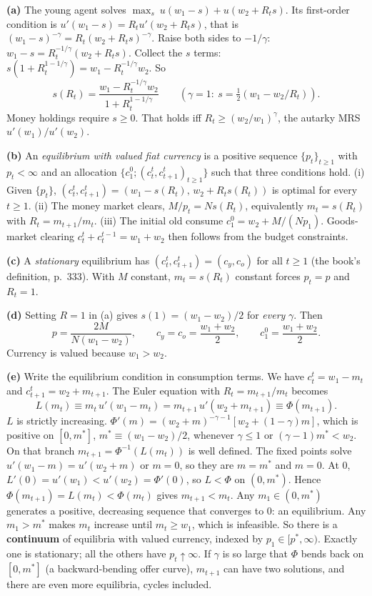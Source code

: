 \documentclass[12pt, letterpaper]{article}
\begin{document}
\begin{tcolorbox}[oddbox,title={Exercise 9.1 \quad Samuelson economy, CRRA utility}]
\textbf{(a)} The young agent solves $\max_s\ u(w_1-s)+u(w_2+R_ts)$. Its first-order condition is
$u'(w_1-s)=R_tu'(w_2+R_ts)$, that is $(w_1-s)^{-\gamma}=R_t(w_2+R_ts)^{-\gamma}$. Raise both sides to
$-1/\gamma$: $w_1-s=R_t^{-1/\gamma}(w_2+R_ts)$. Collect the $s$ terms: $s(1+R_t^{1-1/\gamma})=w_1-R_t^{-1/\gamma}w_2$. So
\[
\boxed{s(R_t)=\frac{w_1-R_t^{-1/\gamma}w_2}{1+R_t^{1-1/\gamma}}}\qquad(\gamma=1:\ s=\tfrac12(w_1-w_2/R_t)).
\]
Money holdings require $s\ge0$. That holds iff $R_t\ge(w_2/w_1)^\gamma$, the autarky MRS
$u'(w_1)/u'(w_2)$.

\textbf{(b)} An \emph{equilibrium with valued fiat currency} is a positive sequence $\{p_t\}_{t\ge1}$
with $p_t<\infty$ and an allocation $\{c_1^0;(c_t^t,c_{t+1}^t)_{t\ge1}\}$ such that three conditions hold.
(i) Given $\{p_t\}$, $(c_t^t,c_{t+1}^t)=(w_1-s(R_t),\,w_2+R_ts(R_t))$ is optimal for every $t\ge1$.
(ii) The money market clears, $M/p_t=Ns(R_t)$, equivalently $m_t=s(R_t)$ with $R_t=m_{t+1}/m_t$.
(iii) The initial old consume $c_1^0=w_2+M/(Np_1)$. Goods-market clearing $c_t^t+c_t^{t-1}=w_1+w_2$ then
follows from the budget constraints.

\textbf{(c)} A \emph{stationary} equilibrium has $(c_t^t,c_{t+1}^t)=(c_y,c_o)$ for all $t\ge1$ (the
book's definition, p.~333). With $M$ constant, $m_t=s(R_t)$ constant forces $p_t=p$ and $R_t=1$.

\textbf{(d)} Setting $R=1$ in (a) gives $s(1)=(w_1-w_2)/2$ for \emph{every} $\gamma$. Then
\[
\boxed{p=\frac{2M}{N(w_1-w_2)},\qquad c_y=c_o=\frac{w_1+w_2}2,\qquad c_1^0=\frac{w_1+w_2}2.}
\]
Currency is valued because $w_1>w_2$.

\textbf{(e)} Write the equilibrium condition in consumption terms. We have
$c_t^t=w_1-m_t$ and $c_{t+1}^t=w_2+m_{t+1}$. The Euler equation with $R_t=m_{t+1}/m_t$ becomes
\[
L(m_t)\equiv m_t\,u'(w_1-m_t)=m_{t+1}\,u'(w_2+m_{t+1})\equiv \Phi(m_{t+1}).
\]
$L$ is strictly increasing. $\Phi'(m)=(w_2+m)^{-\gamma-1}[w_2+(1-\gamma)m]$, which is positive on
$[0,m^*]$, $m^*\equiv(w_1-w_2)/2$, whenever $\gamma\le1$ or $(\gamma-1)m^*<w_2$. On that branch
$m_{t+1}=\Phi^{-1}(L(m_t))$ is well defined. The fixed points solve $u'(w_1-m)=u'(w_2+m)$ or $m=0$,
so they are $m=m^*$ and $m=0$. At $0$, $L'(0)=u'(w_1)<u'(w_2)=\Phi'(0)$, so $L<\Phi$ on $(0,m^*)$.
Hence $\Phi(m_{t+1})=L(m_t)<\Phi(m_t)$ gives $m_{t+1}<m_t$. Any $m_1\in(0,m^*)$ generates a positive,
decreasing sequence that converges to $0$: an equilibrium. Any $m_1>m^*$ makes $m_t$ increase until
$m_t\ge w_1$, which is infeasible. So there is a \textbf{continuum} of equilibria with valued
currency, indexed by $p_1\in[p^*,\infty)$. Exactly one is stationary; all the others have
$p_t\uparrow\infty$. If $\gamma$ is so large that $\Phi$ bends back on $[0,m^*]$ (a backward-bending
offer curve), $m_{t+1}$ can have two solutions, and there are even more equilibria, cycles
included.


\end{tcolorbox}
\end{document}
